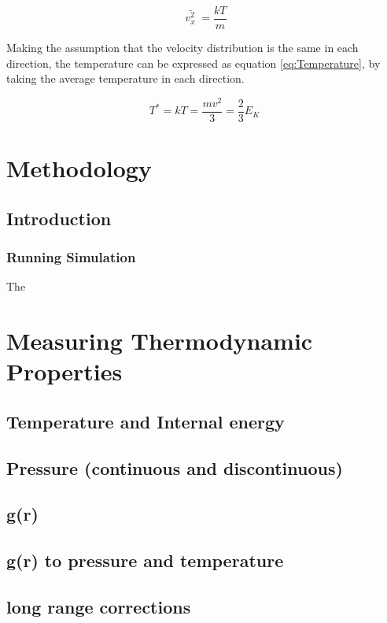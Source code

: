 \documentclass[12pt]{UoAthesis}
\begin{document}
\begin{equation}
  \label{eq:MSV}
  \bar{\;v_x^2\;} = \frac{kT}{m}
\end{equation}

Making the assumption that the velocity distribution is the same in
each direction, the temperature can be expressed as equation
\eqref{eq:Temperature}, by taking the average temperature in each
direction. 

\begin{equation}
\label{eq:Temperature}
  T^* = kT = \frac{mv^2}{3} = \frac{2}{3}E_K
\end{equation}
\newpage

\chapter{Methodology} 
\section{Introduction} 



\subsection{Running Simulation} 
The


\chapter{Measuring Thermodynamic Properties}

\section{Temperature and Internal energy }
\section{Pressure (continuous and discontinuous)}
\section{g(r)}
\section{g(r) to pressure and temperature}
\section{long range corrections}
\end{document}

